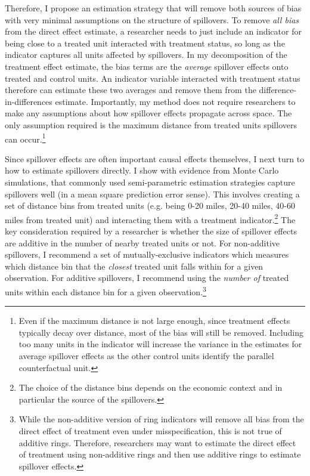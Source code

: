 \documentclass[11pt]{article}
\begin{document}
Therefore, I propose an estimation strategy that will remove both sources of bias with very minimal assumptions on the structure of spillovers. To remove \textit{all bias} from the direct effect estimate, a researcher needs to just include an indicator for being close to a treated unit interacted with treatment status, so long as the indicator captures all units affected by spillovers. In my decomposition of the treatment effect estimate, the bias terms are the \textit{average} spillover effects onto treated and control units. An indicator variable interacted with treatment status therefore can estimate these two averages and remove them from the difference-in-differences estimate. Importantly, my method does not require researchers to make any assumptions about how spillover effects propagate across space. The only assumption required is the maximum distance from treated units spillovers can occur.\footnote{Even if the maximum distance is not large enough, since treatment effects typically decay over distance, most of the bias will still be removed. Including too many units in the indicator will increase the variance in the estimates for average spillover effects as the other control units identify the parallel counterfactual unit.} 

Since spillover effects are often important causal effects themselves, I next turn to how to estimate spillovers directly. I show with evidence from Monte Carlo simulations, that commonly used semi-parametric estimation strategies capture spillovers well (in a mean square prediction error sense). This involves creating a set of distance bins from treated units (e.g. being 0-20 miles, 20-40 miles, 40-60 miles from treated unit) and interacting them with a treatment indicator.\footnote{The choice of the distance bins depends on the economic context and in particular the source of the spillovers.} The key consideration required by a researcher is whether the size of spillover effects are additive in the number of nearby treated units or not. For non-additive spillovers, I recommend a set of mutually-exclusive indicators which measures which distance bin that the \textit{closest} treated unit falls within for a given observation. For additive spillovers, I recommend using the \textit{number of} treated units within each distance bin for a given observation.\footnote{While the non-additive version of ring indicators will remove all bias from the direct effect of treatment even under misspecification, this is not true of additive rings. Therefore, researchers may want to estimate the direct effect of treatment using non-additive rings and then use additive rings to estimate spillover effects.} 
\end{document}
